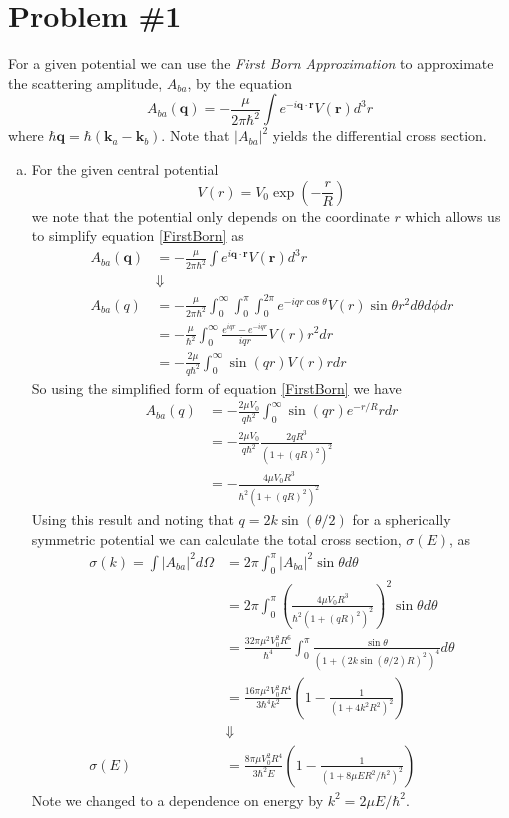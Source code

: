 \documentclass[11pt]{article}
\numberwithin{equation}{section}
\begin{document}


\section{Problem \#1}
For a given potential we can use the \emph{First Born Approximation} to approximate 
the scattering amplitude, $A_{ba}$, by the equation 
\begin{equation}
A_{ba}(\mathbf{q}) = -\frac{\mu}{2\pi\hbar^2}\int{e^{-i\mathbf{q}\cdot\mathbf{r}}}V(\mathbf{r})d^3r
\label{FirstBorn}
\end{equation}
where $\hbar\mathbf{q} =  \hbar(\mathbf{k}_a - \mathbf{k}_b)$. Note that $|A_{ba}|^2$ 
yields the differential cross section.

\begin{enumerate}[(a)]
\item For the given central potential 
$$V(r) = V_0\exp\left(-\frac{r}{R}\right)$$
we note that the potential only depends on the coordinate $r$ which allows us to simplify
equation \ref{FirstBorn} as
\begin{align*}
A_{ba}(\mathbf{q}) &= -\frac{\mu}{2\pi\hbar^2}\int{e^{i\mathbf{q}\cdot\mathbf{r}}}V(\mathbf{r})d^3r\\
&\Downarrow\\
A_{ba}(q) &=  -\frac{\mu}{2\pi\hbar^2}\int_{0}^{\infty}\int_{0}^{\pi}\int_{0}^{2\pi}{e^{-iqr\cos\theta}}V(r)\sin\theta r^2{d\theta}{d\phi}{dr}\\
&=  -\frac{\mu}{\hbar^2}\int_{0}^{\infty}\frac{e^{iqr}-e^{-iqr}}{iqr}V(r)r^2{dr}\\
&=  -\frac{2\mu}{q\hbar^2}\int_{0}^{\infty}\sin(qr)V(r)rdr
\end{align*}
So using the simplified form of equation \ref{FirstBorn} we have
\begin{align*}
A_{ba}(q) &= -\frac{2\mu{V_0}}{q\hbar^2}\int_{0}^{\infty}\sin(qr)e^{-r/R}rdr\\
&= -\frac{2\mu{V_0}}{q\hbar^2}\frac{2qR^3}{(1+(qR)^2)^2}\\
&= -\frac{4\mu{V_0}R^3}{\hbar^2(1+(qR)^2)^2}
\end{align*}
Using this result and noting that $q=2k\sin(\theta/2)$ for a spherically symmetric 
potential we can calculate the total cross section, $\sigma(E)$, as
\begin{align*}
\sigma(k) = \int|A_{ba}|^2d\Omega &= 2\pi\int_{0}^{\pi}|A_{ba}|^2\sin\theta{d\theta}\\
&= 2\pi\int_{0}^{\pi}\left(\frac{4\mu{V_0}R^3}{\hbar^2(1+(qR)^2)^2}\right)^2\sin\theta{d\theta}\\
&= \frac{32\pi\mu^2{V_0^2}R^6}{\hbar^4}\int_{0}^{\pi}\frac{\sin\theta}{(1+(2k\sin(\theta/2)R)^2)^4}{d\theta}\\
&= \frac{16\pi\mu^2{V_0^2}R^4}{3\hbar^4k^2}\left(1-\frac{1}{(1+4k^2R^2)^2}\right)\\
&\Downarrow\\
\sigma(E) &= \frac{8\pi\mu{V_0^2}R^4}{3\hbar^2E}\left(1-\frac{1}{(1+8\mu{E}R^2/\hbar^2)^2}\right)
\end{align*}
Note we changed to a dependence on energy by $k^2=2\mu{E}/\hbar^2$.


\end{enumerate}
\end{document}
